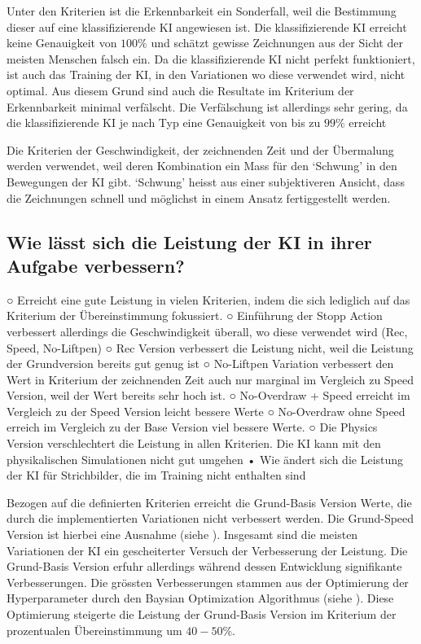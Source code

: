 Unter den Kriterien ist die Erkennbarkeit ein Sonderfall, weil die Bestimmung
dieser auf eine klassifizierende KI angewiesen ist. Die klassifizierende KI
erreicht keine Genauigkeit von $100\%$ und schätzt gewisse Zeichnungen aus der
Sicht der meisten Menschen falsch ein. Da die klassifizierende KI nicht perfekt
funktioniert, ist auch das Training der KI, in den Variationen wo diese
verwendet wird, nicht optimal. Aus diesem Grund sind auch die Resultate im
Kriterium der Erkennbarkeit minimal verfälscht. Die Verfälschung ist allerdings
sehr gering, da die klassifizierende KI je nach Typ eine Genauigkeit von bis zu
$99\%$ erreicht 

Die Kriterien der Geschwindigkeit, der zeichnenden Zeit und der Übermalung
werden verwendet, weil deren Kombination ein Mass für den `Schwung' in den
Bewegungen der KI gibt. `Schwung' heisst aus einer subjektiveren Ansicht, dass
die Zeichnungen schnell und möglichst in einem Ansatz fertiggestellt werden.


\subsection{Wie lässt sich die Leistung der KI in ihrer Aufgabe verbessern?}\label{subsub:d_frage_unter_3}





○ Erreicht eine gute Leistung in vielen Kriterien, indem die sich lediglich auf das Kriterium der Übereinstimmung fokussiert.
		○ Einführung der Stopp Action verbessert allerdings die Geschwindigkeit überall, wo diese verwendet wird (Rec, Speed, No-Liftpen)
		○ Rec Version verbessert die Leistung nicht, weil die Leistung der Grundversion bereits gut genug ist
		○ No-Liftpen Variation verbessert den Wert in Kriterium der zeichnenden Zeit auch nur marginal im Vergleich zu Speed Version, weil der Wert bereits sehr hoch ist.
		○ No-Overdraw + Speed erreicht im Vergleich zu der Speed Version leicht bessere Werte
		○ No-Overdraw ohne Speed erreich im Vergleich zu der Base Version viel bessere Werte.
		○ Die Physics Version verschlechtert die Leistung in allen Kriterien. Die KI kann mit den physikalischen Simulationen nicht gut umgehen
	• Wie ändert sich die Leistung der KI für Strichbilder, die im Training nicht enthalten sind



Bezogen auf die definierten Kriterien erreicht die Grund-Basis Version Werte,
die durch die implementierten Variationen nicht verbessert werden. Die
Grund-Speed Version ist hierbei eine Ausnahme (siehe ).
Insgesamt sind die meisten Variationen der KI ein gescheiterter Versuch der
Verbesserung der Leistung. Die Grund-Basis Version erfuhr allerdings während
dessen Entwicklung signifikante Verbesserungen. Die grössten Verbesserungen
stammen aus der Optimierung der Hyperparameter durch den Baysian Optimization
Algorithmus (siehe ). Diese Optimierung steigerte
die Leistung der Grund-Basis Version im Kriterium der prozentualen
Übereinstimmung um $40-50\%$.
 

